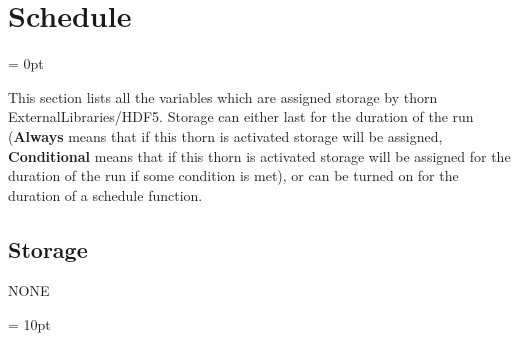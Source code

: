
\section{Schedule} 


\parskip = 0pt


\noindent This section lists all the variables which are assigned storage by thorn ExternalLibraries/HDF5.  Storage can either last for the duration of the run ({\bf Always} means that if this thorn is activated storage will be assigned, {\bf Conditional} means that if this thorn is activated storage will be assigned for the duration of the run if some condition is met), or can be turned on for the duration of a schedule function.


\subsection*{Storage}NONE

\vspace{5mm}\parskip = 10pt 
